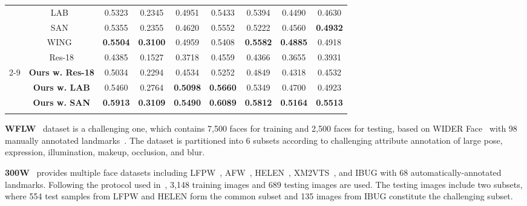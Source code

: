 \documentclass[10pt,twocolumn,letterpaper]{article}
\begin{document}
\begin{table*}[htb]
\begin{center}
{\begin{tabular}{c|c|c|c|c|c|c|c|c}
                                   & LAB~\cite{LAB}                    & 0.5323          & 0.2345          & 0.4951          & 0.5433          & 0.5394          & 0.4490          & 0.4630           \\
                                   & SAN~\cite{SAN}                    & 0.5355          & 0.2355          & 0.4620          & 0.5552          & 0.5222          & 0.4560          & \textbf{0.4932}  \\
                                   & WING~\cite{feng2018wing}                   & \textbf{0.5504} & \textbf{0.3100} & 0.4959          & 0.5408          & \textbf{0.5582} & \textbf{0.4885} & 0.4918           \\ 
                                   & Res-18                 & 0.4385          & 0.1527          & 0.3718          & 0.4559          & 0.4366          & 0.3655          & 0.3931           \\
\cline{2-9}
                                   & \textbf{Ours w. Res-18} & 0.5034          & 0.2294          & 0.4534          & 0.5252          & 0.4849          & 0.4318          & 0.4532           \\
                                   & \textbf{Ours w. LAB}    & 0.5460          & 0.2764          & \textbf{0.5098} & \textbf{0.5660} & 0.5349          & 0.4700          & 0.4923           \\
                                   & \textbf{Ours w. SAN}    & \textbf{0.5913} & \textbf{0.3109} & \textbf{0.5490} & \textbf{0.6089} & \textbf{0.5812} & \textbf{0.5164} & \textbf{0.5513}  \\
\Xhline{1.2pt}
\end{tabular}}
\end{center}
\vspace{-0.5cm}
\caption{\label{tb_wflw} \small{Evaluation of our approach on WFLW dataset. Top-2 results are highlighted in bold font.}}
\end{table*}

\noindent \textbf{WFLW}~\cite{LAB} dataset is a challenging one, which contains 7,500 faces for training and 2,500 faces for testing, based on WIDER Face~\cite{yang2016wider} with 98 manually annotated landmarks~\cite{LAB}. The dataset is partitioned into 6 subsets according to challenging attribute annotation of large pose, expression, illumination, makeup, occlusion, and blur. 

\noindent\textbf{300W}~\cite{sagonas2013300} provides multiple face datasets including LFPW~\cite{LFPW}, AFW~\cite{AFW}, HELEN~\cite{HELEN}, XM2VTS~\cite{messer1999xm2vtsdb}, and IBUG with 68 automatically-annotated landmarks. Following the protocol used in~\cite{LBF}, 3,148 training images and 689 testing images are used. The testing images include two subsets, where 554 test samples from LFPW and HELEN form the common subset and 135 images from IBUG constitute the challenging subset.
\end{document}
